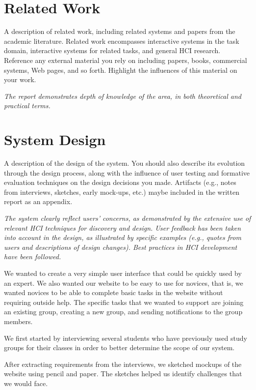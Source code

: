 \documentclass[conference]{IEEEtran}
\begin{document}
\section{Related Work}
A description of related work, including related systems and papers from the academic literature. Related work encompasses interactive systems in the task domain, interactive systems for related tasks, and general HCI research. Reference any external material you rely on including papers, books, commercial systems, Web pages, and so forth. Highlight the influences of this material on your work. 

\emph{The report demonstrates depth of knowledge of the area, in both theoretical and practical terms.}

\section{System Design}
A description of the design of the system. You should also describe its evolution through the design process, along with the influence of user testing and formative evaluation techniques on the design decisions you made. Artifacts (e.g., notes from interviews, sketches, early mock-ups, etc.) maybe included in the written report as an appendix. 

\emph{The system clearly reflect users' concerns, as demonstrated by the extensive use of relevant HCI techniques for discovery and design. User feedback has been taken into account in the design, as illustrated by specific examples (e.g., quotes from users and descriptions of design changes). Best practices in HCI development have been followed.}


We wanted to create a very simple user interface that could be quickly used by an expert.
We also wanted our website to be easy to use for novices, that is, we wanted novices to be able to complete basic tasks in the website without requiring outside help.
The specific tasks that we wanted to support are joining an existing group, creating a new group, and sending notifications to the group members.

We first started by interviewing several students who have previously used study groups for their classes in order to better determine the scope of our system.

After extracting requirements from the interviews, we sketched mockups of the website using pencil and paper.
The sketches helped us identify challenges that we would face.
\end{document}
